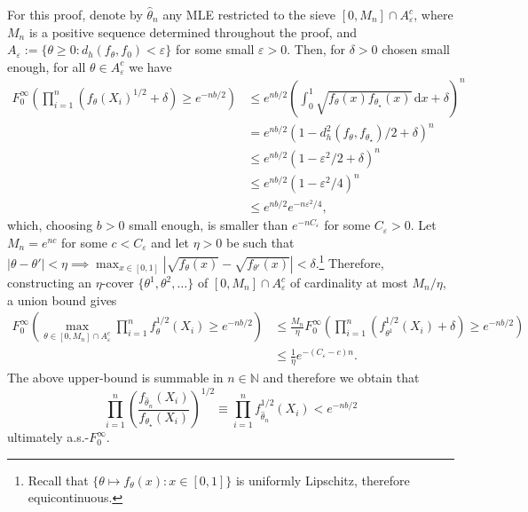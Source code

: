 \documentclass[11pt,twoside]{article}
\def\NN{\mathbb{N}}
\begin{document}
For this proof, denote by $\hat\theta_n$ any MLE restricted to the sieve $[0,M_n] \cap A_\varepsilon^c$, where $M_n$ is a positive sequence determined throughout the proof, and $A_\varepsilon := \{\theta\geq 0 : d_h(f_\theta, f_0)<\varepsilon\}$ for some small $\varepsilon>0$. Then, for $\delta>0$ chosen small enough, for all $\theta\in A_\varepsilon^c$ we have
%
\begin{align*}
    F_{0}^\infty\left( \prod_{i=1}^n\left(f_\theta(X_i)^{1/2} +\delta\right) \geq e^{-nb/2}\right) & \leq e^{nb/2} \left(\int_0^1\sqrt{f_\theta(x)f_{\theta_\star}(x)}\,\mathrm dx + \delta\right)^n \\
    & =e^{nb/2} \left(1- d_h^2(f_\theta, f_{\theta_\star})/2 + \delta\right)^n \\
    & \leq e^{nb/2} (1-\varepsilon^2/2 + \delta)^n \\
    & \leq e^{nb/2} (1-\varepsilon^2/4)^n \\
    & \leq e^{nb/2} e^{-n\varepsilon^2/4},
\end{align*}
%
which, choosing $b>0$ small enough, is smaller than $e^{-nC_\varepsilon}$ for some $C_\varepsilon>0$. Let $M_n = e^{nc}$ for some $c<C_\varepsilon$ and let $\eta>0$ be such that $|\theta-\theta'|<\eta \implies \max_{x\in[0,1]}|\sqrt{f_\theta(x)} - \sqrt{f_{\theta'}(x)}| < \delta$.\footnote{Recall that $\{\theta \mapsto f_\theta(x): x\in[0,1]\}$ is uniformly Lipschitz, therefore equicontinuous.} Therefore, constructing an $\eta$-cover $\{\theta^1,\theta^2,\dots\}$ of $[0,M_n]\cap A_\varepsilon^c$ of cardinality at most $M_n/\eta$, a union bound gives
%
\begin{align*}
    F_{0}^\infty\left( \max_{\theta \in  [0,M_n] \cap A_\varepsilon^c} \prod_{i=1}^nf_\theta^{1/2}(X_i) \geq e^{-nb/2}\right) & \leq \frac{M_n}{\eta} F_{0}^\infty\left( \prod_{i=1}^n\left(f_{\theta^1}^{1/2}(X_i)+\delta\right) \geq e^{-nb/2}\right)\\
    & \leq \frac{1}{\eta}e^{-(C_\varepsilon - c)n}.
\end{align*}
%
The above upper-bound is summable in $n\in\NN$ and therefore we obtain that
%
\begin{equation}\label{eq:sieve_MLE_consistent}
    \prod_{i=1}^n\left(\frac{f_{\hat\theta_n}(X_i)}{f_{\theta_\star}(X_i)}\right)^{1/2} \equiv \prod_{i=1}^n f_{\hat\theta_n}^{1/2}(X_i) < e^{-nb/2}
\end{equation}
%
ultimately a.s.-$F_{0}^\infty$.
\end{document}
